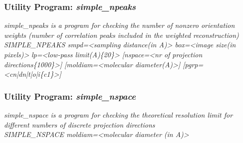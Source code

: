 \documentclass[review]{elsarticle}
\begin{document}
{{\subsubsection{Utility Program: {\it{simple\_npeaks}}}
\label{npeaks}
{\it{simple\_npeaks} is a program for checking the number of nonzero orientation weights (number of correlation peaks included in the weighted reconstruction)}\\
{\it{SIMPLE\_NPEAKS smpd=<sampling distance(in A)> box=<image size(in pixels)>}}
{\it{lp=<low-pass limit(A)\{20\}> [nspace=<nr of projection directions\{1000\}>]}}
{\it{[moldiam=<molecular diameter(A)>] [pgrp=<cn|dn|t|o|i\{c1\}>]}}

\subsubsection{Utility Program: {\it{simple\_nspace}}}
\label{nspace}
{\it{simple\_nspace} is a program for checking the theoretical resolution limit for different numbers of discrete projection directions}\\
{\it{SIMPLE\_NSPACE moldiam=<molecular diameter (in A)>}}

}}
\end{document}
